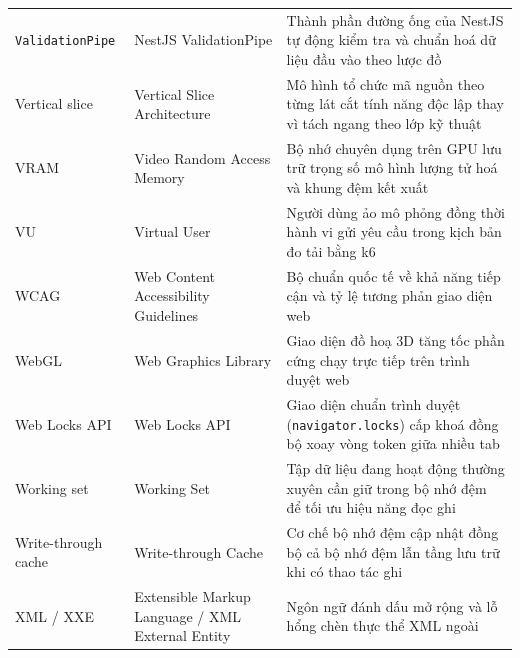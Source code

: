 {\begin{longtable}{@{}>{\raggedright\arraybackslash}p{3.4cm}>{\raggedright\arraybackslash}p{4.7cm}>{\raggedright\arraybackslash}p{7.15cm}@{}}
    \texttt{ValidationPipe} & NestJS ValidationPipe & Thành phần đường ống của NestJS tự động kiểm tra và chuẩn hoá dữ liệu đầu vào theo lược đồ \\
    Vertical slice & Vertical Slice Architecture & Mô hình tổ chức mã nguồn theo từng lát cắt tính năng độc lập thay vì tách ngang theo lớp kỹ thuật \\
    VRAM & Video Random Access Memory & Bộ nhớ chuyên dụng trên GPU lưu trữ trọng số mô hình lượng tử hoá và khung đệm kết xuất \\
    VU & Virtual User & Người dùng ảo mô phỏng đồng thời hành vi gửi yêu cầu trong kịch bản đo tải bằng k6 \\
    WCAG & Web Content Accessibility Guidelines & Bộ chuẩn quốc tế về khả năng tiếp cận và tỷ lệ tương phản giao diện web \\
    WebGL & Web Graphics Library & Giao diện đồ hoạ 3D tăng tốc phần cứng chạy trực tiếp trên trình duyệt web \\
    Web Locks API & Web Locks API & Giao diện chuẩn trình duyệt (\texttt{navigator.locks}) cấp khoá đồng bộ xoay vòng token giữa nhiều tab \\
    Working set & Working Set & Tập dữ liệu đang hoạt động thường xuyên cần giữ trong bộ nhớ đệm để tối ưu hiệu năng đọc ghi \\
    Write-through cache & Write-through Cache & Cơ chế bộ nhớ đệm cập nhật đồng bộ cả bộ nhớ đệm lẫn tầng lưu trữ khi có thao tác ghi \\
    XML / XXE & Extensible Markup Language / XML External Entity & Ngôn ngữ đánh dấu mở rộng và lỗ hổng chèn thực thể XML ngoài \\
\end{longtable}
}
